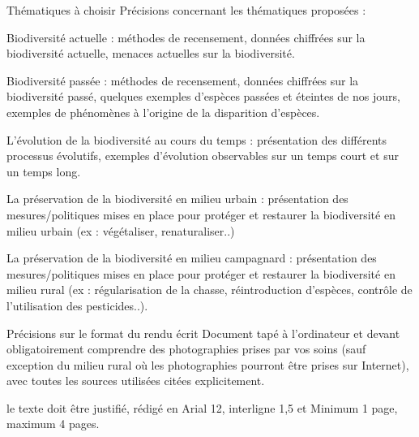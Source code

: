 \begin{doc}{Thématiques à choisir}
Précisions concernant les thématiques proposées :
\begin{listePoints}
    
\item Biodiversité actuelle : méthodes de recensement, données chiffrées sur la biodiversité actuelle, menaces actuelles sur la biodiversité.
\item Biodiversité passée : méthodes de recensement, données chiffrées sur la biodiversité passé, quelques exemples d’espèces passées et éteintes de nos jours, exemples de phénomènes à l’origine de la disparition d’espèces.
\item L’évolution de la biodiversité au cours du temps : présentation des différents processus évolutifs, exemples d’évolution observables sur un temps court et sur un temps long.
\item La préservation de la biodiversité en milieu urbain : présentation des mesures/politiques mises en place pour protéger et restaurer la biodiversité en milieu urbain (ex : végétaliser, renaturaliser..)
\item La préservation de la biodiversité en milieu campagnard :  présentation des mesures/politiques mises en place pour protéger et restaurer la biodiversité en milieu rural (ex : régularisation de la chasse, réintroduction d’espèces, contrôle de l’utilisation des pesticides..).
\end{listePoints}
\end{doc}

\begin{doc}{Précisions sur le format du rendu écrit}
Document tapé à l’ordinateur et devant obligatoirement comprendre des photographies prises par vos soins (sauf exception du milieu rural où les photographies pourront être prises sur Internet), avec toutes les sources utilisées citées explicitement.

 le texte doit être justifié, rédigé en Arial 12, interligne 1,5 et  Minimum 1 page, maximum 4 pages.
\end{doc}